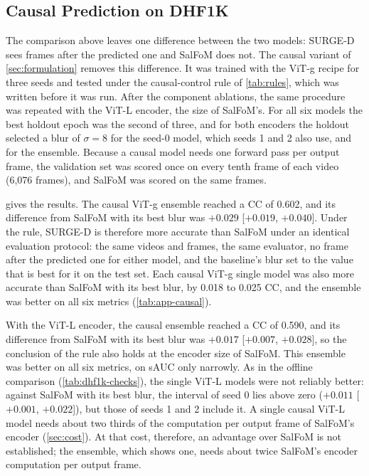 \subsection{Causal Prediction on DHF1K}\label{sec:causal}

The comparison above leaves one difference between the two models: SURGE-D
sees frames after the predicted one and SalFoM does not. The causal variant of
\cref{sec:formulation} removes this difference. It was trained with the
\acrshort{ViT}-g recipe for three seeds and tested under the causal-control rule of
\cref{tab:rules}, which was written before it was run. After the component
ablations, the same procedure was repeated with the \acrshort{ViT}-L encoder, the size of
SalFoM's. For all six models the best holdout epoch was the second of three, and
for both encoders the holdout selected a blur of $\sigma=8$ for the seed-0 model,
which seeds 1 and 2 also use, and for the ensemble.
Because a causal model needs one forward pass per output frame, the validation
set was scored once on every tenth frame of each video (6,076 frames), and
SalFoM was scored on the same frames.

 gives the results. The causal \acrshort{ViT}-g ensemble reached a \acrshort{CC} of
0.602, and its difference from SalFoM with its best blur was $+0.029$
[$+0.019$, $+0.040$]. Under the rule, SURGE-D is therefore more accurate than
SalFoM under an identical evaluation protocol: the same videos and frames, the
same evaluator, no frame after the predicted one for either model, and the
baseline's blur set to the value that is best for it on the test set. Each
causal \acrshort{ViT}-g single model was also more accurate than SalFoM with its best blur, by
0.018 to 0.025 \acrshort{CC}, and the ensemble was better on all six metrics
(\cref{tab:app-causal}).

With the \acrshort{ViT}-L encoder, the causal ensemble reached a \acrshort{CC} of 0.590, and its
difference from SalFoM with its best blur was $+0.017$ [$+0.007$, $+0.028$], so
the conclusion of the rule also holds at the encoder size of SalFoM. This
ensemble was better on all six metrics, on \acrshort{sAUC} only narrowly. As in the
offline comparison (\cref{tab:dhf1k-checks}), the single \acrshort{ViT}-L models were not
reliably better: against SalFoM with its best blur, the interval of seed 0 lies
above zero ($+0.011$ [$+0.001$, $+0.022$]), but those of seeds 1 and 2 include
it. A single causal \acrshort{ViT}-L model needs about two thirds of the computation
per output frame of SalFoM's encoder (\cref{sec:cost}). At that cost,
therefore, an advantage over SalFoM is not established; the ensemble, which
shows one, needs about twice SalFoM's encoder computation per output frame.

